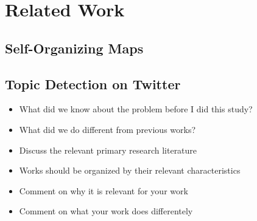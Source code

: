 \section{Related Work} %
\label{sec:related_work}

\subsection{Self-Organizing Maps} %
\label{sub:self_organizing_maps}


\subsection{Topic Detection on Twitter} %
\label{sub:topic_detection_on_twitter}


\begin{itemize}
  \item What did we know about the problem before I did this study? 
  \item What did we do different from previous works? 
  \item Discuss the relevant primary research literature 
  \item Works should be organized by their relevant characteristics 
  \item Comment on why it is relevant for your work 
  \item Comment on what your work does differentely 
\end{itemize}